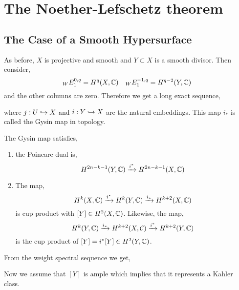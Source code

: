 \documentclass[12pt]{article}
\begin{document}
\section{The Noether-Lefschetz theorem}

\newcommand{\prim}{\mathrm{prim}}
\newcommand{\van}{\mathrm{van}}

\subsection{The Case of a Smooth Hypersurface}

As before, $X$ is projective and smooth and $Y \subset X$ is a smooth divisor. Then consider,
\[ {}_W E^{0,q}_1 = H^q(X, \mathbb{C}) \quad {}_W E_1^{-1,q} = H^{q-2}(Y, \mathbb{C}) \]
and the other columns are zero. Therefore we get a long exact sequence,
\begin{center}
\end{center}
where $j : U \hookrightarrow X$ and $i : Y \hookrightarrow X$ are the natural embeddings. This map $i_*$ is called the Gysin map in topology. 

\begin{prop}
The Gysin map satisfies,
\begin{enumerate}
\item the Poincare dual is,
\[ H^{2n - k - 1}(Y, \mathbb{C}) \xrightarrow{i^*} H^{2n - k - 1}(X, \mathbb{C}) \]
\item The map,
\[ H^k(X, \mathbb{C}) \xrightarrow{i^*} H^k(Y, \mathbb{C}) \xrightarrow{i_*} H^{k+2}(X, \mathbb{C}) \]
is cup product with $[Y] \in H^2(X, \mathbb{C})$. Likewise, the map,
\[ H^k(Y, \mathbb{C}) \xrightarrow{i_*} H^{k+2}(X, \mathcal{C}) \xrightarrow{i^*} H^{k+2}(Y, \mathbb{C}) \]
is the cup product of $[Y] = i^* [Y] \in H^2(Y, \mathbb{C})$. 
\end{enumerate}
\end{prop}

From the weight spectral sequence we get,
\begin{center}
\end{center}
Now we assume that $[Y]$ is ample which implies that it represents a Kahler class.
\end{document}
